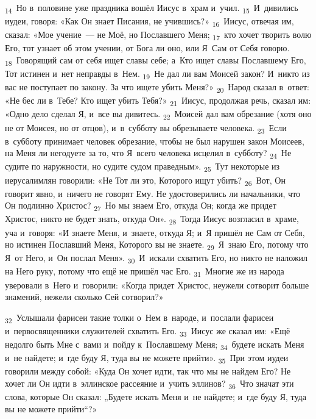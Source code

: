 \documentclass[a4paper,12pt]{article}
\begin{document}
\textsubscript{14}~Но в~половине уже праздника вошёл Иисус в~храм и~учил.
\textsubscript{15}~И~дивились иудеи, говоря: «Как Он знает Писания, не учившись?»
\textsubscript{16}~Иисус, отвечая им, сказал: «Мое учение~--- не Моё, но Пославшего Меня;
\textsubscript{17}~кто хочет творить волю Его, тот узнает об этом учении, от Бога ли оно, или Я~Сам от Себя говорю.
\textsubscript{18}~Говорящий сам от себя ищет славы себе; а~Кто ищет славы Пославшему Его, Тот истинен и~нет неправды в~Нем.
\textsubscript{19}~Не дал ли вам Моисей закон? И~никто из вас не поступает по закону. За что ищете убить Меня?»
\textsubscript{20}~Народ сказал в~ответ: «Не бес ли в~Тебе? Кто ищет убить Тебя?»
\textsubscript{21}~Иисус, продолжая речь, сказал им: «Одно дело сделал Я, и~все вы дивитесь.
\textsubscript{22}~Моисей дал вам обрезание (хотя оно не от Моисея, но от отцов), и~в~субботу вы обрезываете человека.
\textsubscript{23}~Если в~субботу принимает человек обрезание, чтобы не был нарушен закон Моисеев, на Меня ли негодуете за то, что Я~всего человека исцелил в~субботу?
\textsubscript{24}~Не судите по наружности, но судите судом праведным».
\textsubscript{25}~Тут некоторые из иерусалимлян говорили: «Не Тот ли это, Которого ищут убить?
\textsubscript{26}~Вот, Он говорит явно, и~ничего не говорят Ему. Не удостоверились ли начальники, что Он подлинно Христос?
\textsubscript{27}~Но мы знаем Его, откуда Он; когда же придет Христос, никто не будет знать, откуда Он».
\textsubscript{28}~Тогда Иисус возгласил в~храме, уча и~говоря: «И знаете Меня, и~знаете, откуда Я; и~Я пришёл не Сам от Себя, но истинен Пославший Меня, Которого вы не знаете.
\textsubscript{29}~Я~знаю Его, потому что Я~от Него, и~Он послал Меня».
\textsubscript{30}~И~искали схватить Его, но никто не наложил на Него руку, потому что ещё не пришёл час Его.
\textsubscript{31}~Многие же из народа уверовали в~Него и~говорили: «Когда придет Христос, неужели сотворит больше знамений, нежели сколько Сей сотворил?»

\textsubscript{32}~Услышали фарисеи такие толки о~Нем в~народе, и~послали фарисеи и~первосвященники служителей схватить Его.
\textsubscript{33}~Иисус же сказал им: «Ещё недолго быть Мне с~вами и~пойду к~Пославшему Меня;
\textsubscript{34}~будете искать Меня и~не найдете; и~где буду Я, туда вы не можете прийти».
\textsubscript{35}~При этом иудеи говорили между собой: «Куда Он хочет идти, так что мы не найдем Его? Не хочет ли Он идти в~эллинское рассеяние и~учить эллинов?
\textsubscript{36}~Что значат эти слова, которые Он сказал: „Будете искать Меня и~не найдете; и~где буду Я, туда вы не можете прийти“?»
\end{document}
